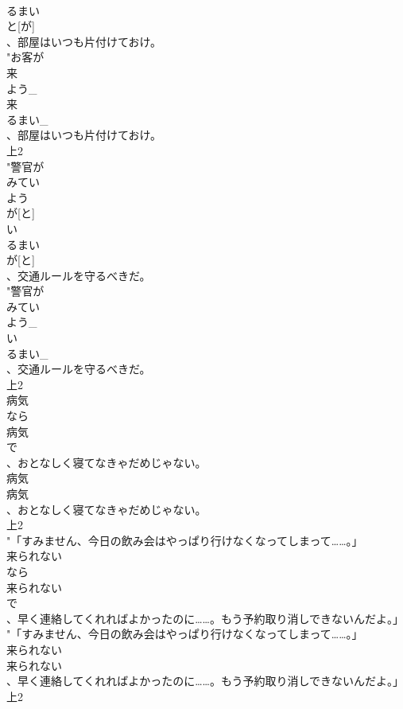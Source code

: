 \documentclass[8pt]{extreport}
\begin{document}
\begin{CJK}{UTF8}{min}
\\	るまい
\\	と[が]
\\	、部屋はいつも片付けておけ。
\\	"お客が
\\	来
\\	よう_
\\	来
\\	るまい_
\\	、部屋はいつも片付けておけ。
\\	上2
\\	"警官が
\\	みてい
\\	よう
\\	が[と]
\\	い
\\	るまい
\\	が[と]
\\	、交通ルールを守るべきだ。
\\	"警官が
\\	みてい
\\	よう_
\\	い
\\	るまい_
\\	、交通ルールを守るべきだ。
\\	上2
\\	病気
\\	なら
\\	病気
\\	で
\\	、おとなしく寝てなきゃだめじゃない。
\\	病気
\\	病気
\\	、おとなしく寝てなきゃだめじゃない。
\\	上2
\\	"「すみません、今日の飲み会はやっぱり行けなくなってしまって……。」
\\	来られない
\\	なら
\\	来られない
\\	で
\\	、早く連絡してくれればよかったのに……。もう予約取り消しできないんだよ。」
\\	"「すみません、今日の飲み会はやっぱり行けなくなってしまって……。」
\\	来られない
\\	来られない
\\	、早く連絡してくれればよかったのに……。もう予約取り消しできないんだよ。」
\\	上2

\end{CJK}
\end{document}
